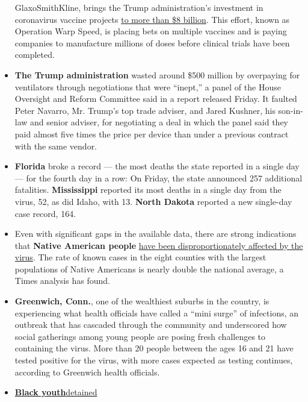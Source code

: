 \begin{itemize}
  GlaxoSmithKline, brings the Trump administration's investment in
  coronavirus vaccine projects
  \href{https://medicalcountermeasures.gov/app/barda/coronavirus/COVID19.aspx?filter=vaccine}{to
  more than \$8 billion}. This effort, known as Operation Warp Speed, is
  placing bets on multiple vaccines and is paying companies to
  manufacture millions of doses before clinical trials have been
  completed.
\item
  \textbf{The Trump administration} wasted around \$500 million by
  overpaying for ventilators through negotiations that were ``inept,'' a
  panel of the House Oversight and Reform Committee said in a report
  released Friday. It faulted Peter Navarro, Mr. Trump's top trade
  adviser, and Jared Kushner, his son-in-law and senior adviser, for
  negotiating a deal in which the panel said they paid almost five times
  the price per device than under a previous contract with the same
  vendor.
\item
  \textbf{Florida} broke a record --- the most deaths the state reported
  in a single day --- for the fourth day in a row: On Friday, the state
  announced 257 additional fatalities. \textbf{Mississippi} reported its
  most deaths in a single day from the virus, 52, as did Idaho, with 13.
  \textbf{North Dakota} reported a new single-day case record, 164.
\item
  Even with significant gaps in the available data, there are strong
  indications that \textbf{Native American people}
  \href{https://www.nytimes3xbfgragh.onion/2020/07/30/us/native-americans-coronavirus-data.html}{have
  been disproportionately affected by the virus}. The rate of known
  cases in the eight counties with the largest populations of Native
  Americans is nearly double the national average, a Times analysis has
  found.
\item
  \textbf{Greenwich, Conn.}, one of the wealthiest suburbs in the
  country, is experiencing what health officials have called a ``mini
  surge'' of infections, an outbreak that has cascaded through the
  community and underscored how social gatherings among young people are
  posing fresh challenges to containing the virus. More than 20 people
  between the ages 16 and 21 have tested positive for the virus, with
  more cases expected as testing continues, according to Greenwich
  health officials.
\item
  \textbf{\href{https://www.nytimes3xbfgragh.onion/2020/07/30/us/politics/juvenile-detainees-coronavirus.html}{Black
  youth}}\href{https://www.nytimes3xbfgragh.onion/2020/07/30/us/politics/juvenile-detainees-coronavirus.html}{detained
}
\end{itemize}
